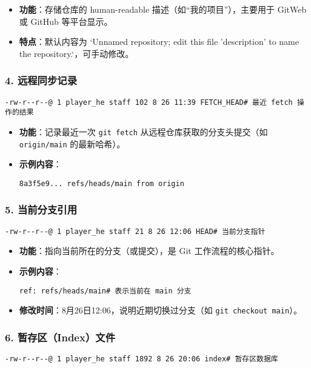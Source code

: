 \begin{itemize}[leftmargin=*, nosep]
    \item \textbf{功能}：存储仓库的 human-readable 描述（如“我的项目”），主要用于 GitWeb 或 GitHub 等平台显示。
    \item \textbf{特点}：默认内容为 `Unnamed repository; edit this file 'description' to name the repository.`，可手动修改。
\end{itemize}

\subsubsection{4. 远程同步记录}
\begin{verbatim}
-rw-r--r--@ 1 player_he staff 102 8 26 11:39 FETCH_HEAD# 最近 fetch 操作的结果
\end{verbatim}

\begin{itemize}[leftmargin=*, nosep]
    \item \textbf{功能}：记录最近一次 \texttt{git fetch} 从远程仓库获取的分支头提交（如 \texttt{origin/main} 的最新哈希）。
    \item \textbf{示例内容}：
    \begin{verbatim}
8a3f5e9... refs/heads/main from origin
    \end{verbatim}
\end{itemize}

\subsubsection{5. 当前分支引用}
\begin{verbatim}
-rw-r--r--@ 1 player_he staff 21 8 26 12:06 HEAD# 当前分支指针
\end{verbatim}

\begin{itemize}[leftmargin=*, nosep]
    \item \textbf{功能}：指向当前所在的分支（或提交），是 Git 工作流程的核心指针。
    \item \textbf{示例内容}：
    \begin{verbatim}
ref: refs/heads/main# 表示当前在 main 分支
    \end{verbatim}
    \item \textbf{修改时间}：8月26日12:06，说明近期切换过分支（如 \texttt{git checkout main}）。
\end{itemize}

\subsubsection{6. 暂存区（Index）文件}
\begin{verbatim}
-rw-r--r--@ 1 player_he staff 1892 8 26 20:06 index# 暂存区数据库
\end{verbatim}

